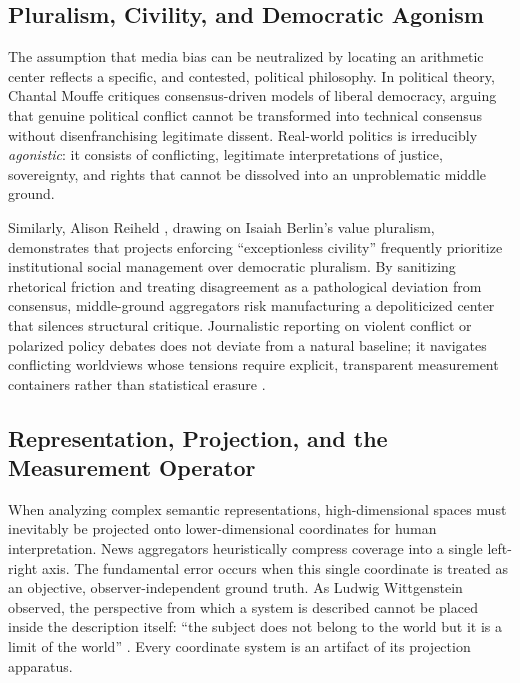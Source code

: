 \subsection{Pluralism, Civility, and Democratic Agonism}

The assumption that media bias can be neutralized by locating an arithmetic center reflects a specific, and contested, political philosophy. In political theory, Chantal Mouffe \citeyearpar{mouffe2000} critiques consensus-driven models of liberal democracy, arguing that genuine political conflict cannot be transformed into technical consensus without disenfranchising legitimate dissent. Real-world politics is irreducibly \emph{agonistic}: it consists of conflicting, legitimate interpretations of justice, sovereignty, and rights that cannot be dissolved into an unproblematic middle ground.

Similarly, Alison Reiheld \citeyearpar{reiheld2013}, drawing on Isaiah Berlin's \citeyearpar{berlin1998} value pluralism, demonstrates that projects enforcing ``exceptionless civility'' frequently prioritize institutional social management over democratic pluralism. By sanitizing rhetorical friction and treating disagreement as a pathological deviation from consensus, middle-ground aggregators risk manufacturing a depoliticized center that silences structural critique. Journalistic reporting on violent conflict or polarized policy debates does not deviate from a natural baseline; it navigates conflicting worldviews whose tensions require explicit, transparent measurement containers rather than statistical erasure \citep{swanstromweissmann2005}.

\subsection{Representation, Projection, and the Measurement Operator}

When analyzing complex semantic representations, high-dimensional spaces must inevitably be projected onto lower-dimensional coordinates for human interpretation. News aggregators heuristically compress coverage into a single left-right axis. The fundamental error occurs when this single coordinate is treated as an objective, observer-independent ground truth. As Ludwig Wittgenstein observed, the perspective from which a system is described cannot be placed inside the description itself: ``the subject does not belong to the world but it is a limit of the world'' \citep{wittgenstein1922}. Every coordinate system is an artifact of its projection apparatus.

